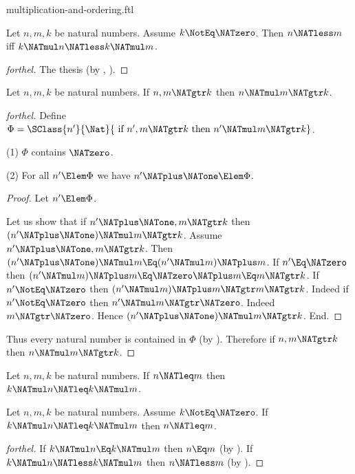 \documentclass{stex}
\begin{document}
\begin{smodule}{multiplication-and-ordering.ftl}
\begin{corollary}[forthel,name=preservation of ordering under left-multiplication]
  Let $n, m, k$ be natural numbers.
  Assume $k \NotEq \NATzero$.
  Then $n \NATless m$ iff $k \NATmul n \NATless k \NATmul m$.
\end{corollary}
\begin{proof}[forthel]
  The thesis (by , ).
\end{proof}

\begin{proposition}[forthel]
  Let $n, m, k$ be natural numbers.
  If $n, m \NATgtr k$ then $n \NATmul m \NATgtr k$.
\end{proposition}
\begin{proof}[forthel]
  Define $\Phi = \SClass{n'}{\Nat}{\text{ if }n', m \NATgtr k\text{ then }n' \NATmul m \NATgtr k}$.

  (1) $\Phi$ contains $\NATzero$.

  (2) For all $n' \Elem \Phi$ we have $n' \NATplus \NATone \Elem \Phi$.
  \begin{proof}
    Let $n' \Elem \Phi$.

    Let us show that if $n' \NATplus \NATone, m \NATgtr k$ then $(n' \NATplus \NATone) \NATmul m \NATgtr k$.
      Assume $n' \NATplus \NATone, m \NATgtr k$.
      Then $(n' \NATplus \NATone) \NATmul m \Eq (n' \NATmul m) \NATplus m$.
      If $n' \Eq \NATzero$ then
      $(n' \NATmul m) \NATplus m
        \Eq \NATzero \NATplus m
        \Eq m
        \NATgtr k$.
      If $n' \NotEq \NATzero$ then
      $(n' \NATmul m) \NATplus m
        \NATgtr m
        \NATgtr k$.
      Indeed if $n' \NotEq \NATzero$ then $n' \NATmul m \NATgtr \NATzero$.
      Indeed $m \NATgtr \NATzero$.
      Hence $(n' \NATplus \NATone) \NATmul m \NATgtr k$.
    End.
  \end{proof}

  Thus every natural number is contained in $\Phi$ (by ).
  Therefore if $n, m \NATgtr k$ then $n \NATmul m \NATgtr k$.
\end{proof}

\begin{corollary}[forthel]
  Let $n, m, k$ be natural numbers.
  If $n \NATleq m$ then $k \NATmul n \NATleq k \NATmul m$.
\end{corollary}

\begin{corollary}[forthel]
  Let $n, m, k$ be natural numbers.
  Assume $k \NotEq \NATzero$.
  If $k \NATmul n \NATleq k \NATmul m$ then $n \NATleq m$.
\end{corollary}
\begin{proof}[forthel]
  If $k \NATmul n \Eq k \NATmul m$ then $n \Eq m$ (by ).
  If $k \NATmul n \NATless k \NATmul m$ then $n \NATless m$ (by ).
\end{proof}


\end{smodule}
\end{document}
